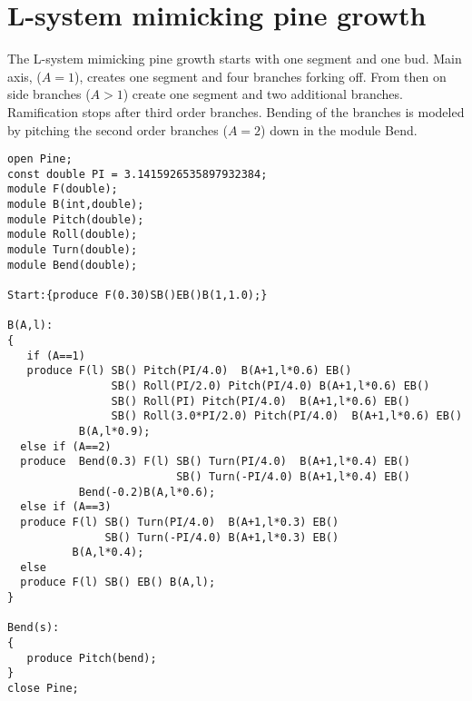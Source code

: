 \section{L-system mimicking pine growth}\label{sec:L1}
The L-system  mimicking pine  growth starts with  one segment  and one
bud.   Main axis, ($A  = 1$),  creates one  segment and  four branches
forking off.  From then on side  branches ($A > 1$) create one segment
and  two additional  branches.  Ramification  stops after  third order
branches. Bending  of the branches  is modeled by pitching  the second
order branches ($A = 2$) down in the module Bend.

\begin{verbatim}
open Pine;
const double PI = 3.1415926535897932384;
module F(double);
module B(int,double);
module Pitch(double);
module Roll(double);
module Turn(double);
module Bend(double);

Start:{produce F(0.30)SB()EB()B(1,1.0);}

B(A,l):
{
   if (A==1)
   produce F(l) SB() Pitch(PI/4.0)  B(A+1,l*0.6) EB() 
                SB() Roll(PI/2.0) Pitch(PI/4.0) B(A+1,l*0.6) EB()
                SB() Roll(PI) Pitch(PI/4.0)  B(A+1,l*0.6) EB() 
                SB() Roll(3.0*PI/2.0) Pitch(PI/4.0)  B(A+1,l*0.6) EB()
           B(A,l*0.9);
  else if (A==2)
  produce  Bend(0.3) F(l) SB() Turn(PI/4.0)  B(A+1,l*0.4) EB() 
                          SB() Turn(-PI/4.0) B(A+1,l*0.4) EB()
           Bend(-0.2)B(A,l*0.6);
  else if (A==3)
  produce F(l) SB() Turn(PI/4.0)  B(A+1,l*0.3) EB() 
               SB() Turn(-PI/4.0) B(A+1,l*0.3) EB()
          B(A,l*0.4);
  else
  produce F(l) SB() EB() B(A,l);
}

Bend(s):
{
   produce Pitch(bend);
}
close Pine;

\end{verbatim}
